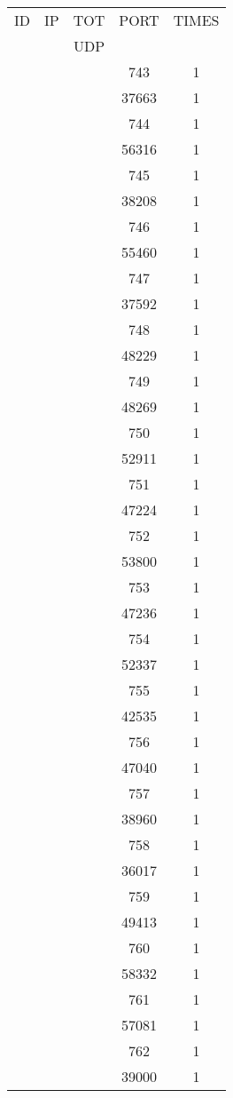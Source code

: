 \documentclass[a4paper]{scrartcl}
\begin{document}
\begin{minipage}[b]{0.5\linewidth}
\begin{tabular}{| c | c | c | c | c |}
\hline
ID & IP & TOT & PORT & TIMES \\ 
   &    & UDP &      &       \\ 
\hline
& & & 743 & 1 \\ & & & 37663 & 1 \\ & & & 744 & 1 \\ & & & 56316 & 1 \\ & & & 745 & 1 \\ & & & 38208 & 1 \\ & & & 746 & 1 \\ & & & 55460 & 1 \\ & & & 747 & 1 \\ & & & 37592 & 1 \\ & & & 748 & 1 \\ & & & 48229 & 1 \\ & & & 749 & 1 \\ & & & 48269 & 1 \\ & & & 750 & 1 \\ & & & 52911 & 1 \\ & & & 751 & 1 \\ & & & 47224 & 1 \\ & & & 752 & 1 \\ & & & 53800 & 1 \\ & & & 753 & 1 \\ & & & 47236 & 1 \\ & & & 754 & 1 \\ & & & 52337 & 1 \\ & & & 755 & 1 \\ & & & 42535 & 1 \\ & & & 756 & 1 \\ & & & 47040 & 1 \\ & & & 757 & 1 \\ & & & 38960 & 1 \\ & & & 758 & 1 \\ & & & 36017 & 1 \\ & & & 759 & 1 \\ & & & 49413 & 1 \\ & & & 760 & 1 \\ & & & 58332 & 1 \\ & & & 761 & 1 \\ & & & 57081 & 1 \\ & & & 762 & 1 \\ & & & 39000 & 1 \\ \hline\end{tabular}\end{minipage} \hfill\begin{minipage}[b]{0.5\linewidth}\begin{tabular}{| c | c | c | c | c |}

\end{tabular}
\end{minipage}
\end{document}
